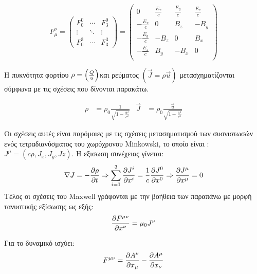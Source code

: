 \[
  F_\mu ^\nu=
  \begin{pmatrix}
    F^0 _0  & \cdots & F^0 _3 \\
    \vdots & \ddots & \vdots \\
    F^3 _0  & \cdots & F^3 _3
  \end{pmatrix}
  =
  \begin{pmatrix}
    0                &\frac{E_x}{c} &\frac{E_y}{c} & \frac{E_z}{c} \\
    -\frac{E_x}{c}   & 0            & B_z          & -B_y \\
    -\frac{E_y}{c}   & -B_z         & 0            & B_x \\
    -\frac{E_z}{c}   & B_y          & -B_x         & 0 \\
  \end{pmatrix} 
\]

Η πυκνότητα φορτίου $\rho = \left(  \frac{Q}{u} \right) $και ρεύματος $(\vec{J}=\rho \vec{u}) $ μετασχηματίζονται σύμφωνα με τις σχέσεις που δίνονται παρακάτω. 

\begin{align}
  \rho &=\rho_0\frac{1}{\sqrt{1-\frac{u^2}{c^2}}}  & \vec{J}& =\rho_0\frac{\vec{u}}{\sqrt{1-\frac{u^2}{c^2}}}
\end{align}

Οι σχέσεις αυτές είναι παρόμοιες με τις σχέσεις μετασηματισμού των συσνιστωσών ενός τετραδιανύσματος του χωρόχρονου Minkowski, το οποίο είναι : $J^{\mu}=(c\rho,J_x,J_y,Jz)$. 
Η εξισωση συνέχειας γίνεται: 
\begin{equation}
  \nabla J = -\frac{\partial \rho}{\partial t} \Rightarrow \sum\limits_{i=1}^3 \frac{\partial J^i}{\partial x^i}=\frac{1}{c}\frac{\partial J^0}{\partial x^0} \Rightarrow \frac{\partial J^{\mu}}{\partial x^{\mu}}=0
  \label{contineq}
\end{equation}
Τέλος οι σχέσεις του \textlatin{Maxwell} γράφονται με την βοήθεια των παραπάνω με μορφή τανυστικής εξίσωσης ως εξής: 
\[
  \frac{\partial F^{\mu \nu}}{\partial x^{\nu}}=\mu_0 J^{\nu}
\]

Για το δυναμικό ισχύει: 
\[
  F^{\mu \nu}=\frac{\partial A^\nu}{\partial x_{\mu}}-\frac{\partial A^\mu}{\partial x_{\nu}}
\]

  
